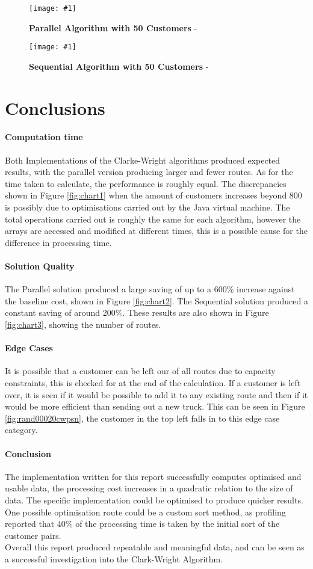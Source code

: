 \documentclass[conference]{acmsiggraph}
\newcommand{\figuremacroW}[4]{
	\begin{figure}[h] %
		\centering
		\texttt{[image: \#1]}
		\caption[#2]{\textbf{#2} - #3}
		\label{fig:#1}
	\end{figure}
}
\begin{document}
\figuremacroW
{rand00050cwpsn}
{Parallel Algorithm with 50 Customers}
{}
{0.755}

\figuremacroW
{rand00050cwsn}
{Sequential Algorithm with 50 Customers}
{}
{0.75}


\section{Conclusions}
\paragraph{Computation time}
Both Implementations of the Clarke-Wright algorithms produced expected results, with the parallel version producing larger and fewer routes. As for the time taken to calculate, the performance is roughly equal.
The discrepancies shown in Figure \ref{fig:chart1} when the amount of customers increases beyond 800 is possibly due to optimisations carried out by the Java virtual machine. The total operations carried out is roughly the same for each algorithm, however the arrays are accessed and modified at different times, this is a possible cause for the difference in processing time.

\paragraph{Solution Quality}
The Parallel solution produced a large saving of up to a 600\% increase against the baseline cost, shown in Figure \ref{fig:chart2}. The Sequential solution produced a constant saving of around 200\%. These results are also shown in Figure \ref{fig:chart3}, showing the number of routes.

\paragraph{Edge Cases}
It is possible that a customer can be left our of all routes due to capacity constraints, this is checked for at the end of the calculation. If a customer is left over, it is seen if it would be possible to add it to any existing route and then if it would be more efficient than sending out a new truck. This can be seen in Figure \ref{fig:rand00020cwpsn}, the customer in the top left falls in to this edge case category.

\paragraph{Conclusion}
The implementation written for this report successfully computes optimised and usable data, the processing cost increases in a quadratic relation to the size of data. The specific implementation could be optimised to produce quicker results. One possible optimisation route could be a custom sort method, as profiling reported that 40\% of the processing time is taken by the initial sort of the customer pairs.\\
Overall this report produced repeatable and meaningful data, and can be seen as a successful investigation into the Clark-Wright Algorithm.


\clearpage
\end{document}
